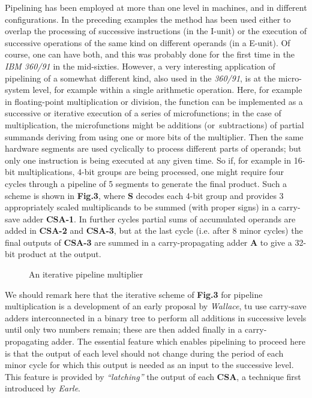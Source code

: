 \documentclass[a4paper,12pt]{article}
\begin{document}
   Pipelining has been employed at more than one level in machines,
and in different configurations. In the preceding examples the method
has been used either to overlap the processing of successive
instructions (in the I-unit) or the execution of successive operations
of the same kind on different operands (in a E-unit). Of course, one
can have both, and this was probably done for the first time in the
\textit{IBM 360/91} in the mid-sixties. However, a very interesting
application of pipelining of a somewhat different kind, also used in
the \textit{360/91}, is at the micro-system level, for example within a single
arithmetic operation. Here, for example in floating-point
multiplication or division, the function can be implemented as a
successive or iterative execution of a series of microfunctions; in
the case of multiplication, the microfunctions might be additions
(or~subtractions) of partial summands deriving from using one or more
bits of the multiplier. Then the same hardware segments are used
cyclically to process different parts of operands; but only one
instruction is being executed at any given time. So if, for example in
16-bit multiplications, 4-bit groups are being processed, one might
require four cycles through a pipeline of 5 segments to generate the
final product. Such a scheme is shown in \textbf{Fig.3}, where
\textbf{S} decodes each 4-bit group and provides 3 appropriately
scaled multiplicands to be summed (with proper signs) in a carry-save
adder \textbf{CSA-1}. In further cycles partial sums of accumulated
operands are added in \textbf{CSA-2} and \textbf{CSA-3}, but at the
last cycle (i.e. after 8 minor cycles) the final outputs of
\textbf{CSA-3} are summed in a carry-propagating adder \textbf{A} to
give a 32-bit product at the output.\medskip


\begin{figure}[h]
	\centering
	
	\caption{An iterative pipeline multiplier}
\end{figure}

   We should remark here that the iterative scheme of \textbf{Fig.3} for
pipeline multiplication is a development of an early proposal by
\textit{Wallace}, tu use carry-save adders interconnected in a binary
tree to perform all additions in successive levels until only two
numbers remain; these are then added finally in a carry-propagating
adder. The essential feature which enables pipelining to proceed here
is that the output of each level should not change during the period
of each minor cycle for which this output is needed as an input to
the successive level. This feature is provided by
\textit{``latching''} the output of each \textbf{CSA}, a technique
first introduced by \textit{Earle}.\medskip%
\end{document}
